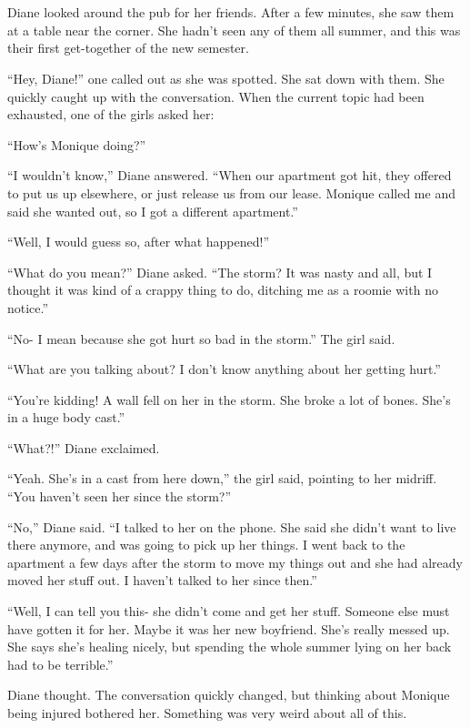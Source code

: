 \chapter{}
Diane looked around the pub for her friends. After a few minutes, she saw them at a table
near the corner. She hadn't seen any of them all summer, and this was their first get-together
of the new semester.

``Hey, Diane!'' one called out as she was spotted. She sat down with them. She quickly
caught up with the conversation. When the current topic had been exhausted, one of the girls
asked her:

``How's Monique doing?''

``I wouldn't know,'' Diane answered. ``When our apartment got hit, they offered to put us
up elsewhere, or just release us from our lease. Monique called me and said she wanted out, so I
got a different apartment.''

``Well, I would guess so, after what happened!''

``What do you mean?'' Diane asked. ``The storm? It was nasty and all, but I thought it was
kind of a crappy thing to do, ditching me as a roomie with no notice.''

``No- I mean because she got hurt so bad in the storm.'' The girl said.

``What are you talking about? I don't know anything about her getting hurt.''

``You're kidding! A wall fell on her in the storm. She broke a lot of bones. She's in a
huge body cast.''

``What?!'' Diane exclaimed.

``Yeah. She's in a cast from here down,'' the girl said, pointing to her midriff. ``You
haven't seen her since the storm?''

``No,'' Diane said. ``I talked to her on the phone. She said she didn't want to live there
anymore, and was going to pick up her things. I went back to the apartment a few days after the
storm to move my things out and she had already moved her stuff out. I haven't talked to her
since then.''

``Well, I can tell you this- she didn't come and get her stuff. Someone else must have
gotten it for her. Maybe it was her new boyfriend. She's really messed up. She says she's
healing nicely, but spending the whole summer lying on her back had to be terrible.''

 Diane thought. The
conversation quickly changed, but thinking about Monique being injured bothered her.  Something was very weird about all of this.

